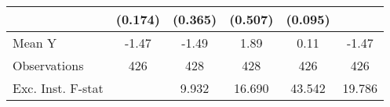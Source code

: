 {\begin{tabular}{l*{5}{c}}
            &     (0.174)         &     (0.365)         &     (0.507)         &     (0.095)         &                     \\
\midrule
Mean Y      &       -1.47         &       -1.49         &        1.89         &        0.11         &       -1.47         \\
Observations&         426         &         428         &         428         &         426         &         426         \\
Exc. Inst. F-stat&                     &       9.932         &      16.690         &      43.542         &      19.786         \\
\bottomrule
\end{tabular}
}
